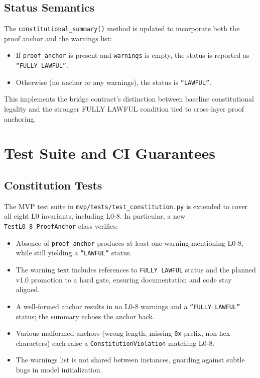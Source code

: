\documentclass[11pt]{article}
\begin{document}
\subsection{Status Semantics}

The \texttt{constitutional\_summary()} method is updated to incorporate both the proof anchor and the warnings list:\cite{cite:41}
\begin{itemize}[nosep]
  \item If \texttt{proof\_anchor} is present and \texttt{warnings} is empty, the status is reported as \texttt{``FULLY LAWFUL''}.
  \item Otherwise (no anchor or any warnings), the status is \texttt{``LAWFUL''}.
\end{itemize}
This implements the bridge contract's distinction between baseline constitutional legality and the stronger FULLY LAWFUL condition tied to cross-layer proof anchoring.\cite{cite:44,cite:46,cite:47}


\section{Test Suite and CI Guarantees}

\subsection{Constitution Tests}

The MVP test suite in \texttt{mvp/tests/test\_constitution.py} is extended to cover all eight L0 invariants, including L0-8.\cite{cite:42, cite:43} In particular, a new \texttt{TestL0\_8\_ProofAnchor} class verifies:
\begin{itemize}[nosep]
  \item Absence of \texttt{proof\_anchor} produces at least one warning mentioning L0-8, while still yielding a \texttt{``LAWFUL''} status.\cite{cite:43}
  \item The warning text includes references to \texttt{FULLY LAWFUL} status and the planned v1.0 promotion to a hard gate, ensuring documentation and code stay aligned.\cite{cite:43}
  \item A well-formed anchor results in no L0-8 warnings and a \texttt{``FULLY LAWFUL''} status; the summary echoes the anchor back.\cite{cite:43}
  \item Various malformed anchors (wrong length, missing \texttt{0x} prefix, non-hex characters) each raise a \texttt{ConstitutionViolation} matching L0-8.\cite{cite:43}
  \item The warnings list is not shared between instances, guarding against subtle bugs in model initialization.\cite{cite:43}
\end{itemize}
\end{document}
